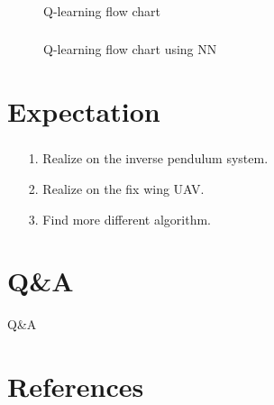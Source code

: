 \documentclass{beamer}
\begin{document}
    \begin{frame}
        \frametitle{\subsubsecname}
        \begin{figure}
            \centering
            
            \caption{Q-learning flow chart}
        \end{figure}

    \end{frame}

    \begin{frame}
        \frametitle{\subsubsecname}
        \begin{figure}
            \centering
            
            \caption{Q-learning flow chart using NN}
        \end{figure}

    \end{frame}

    \section{Expectation}
    \begin{frame}
        \frametitle{\secname}
        \begin{itemize}
            \item[1.] Realize on the inverse pendulum system.
            \item[2.] Realize on the fix wing UAV.
            \item[3.] Find more different algorithm.
        \end{itemize}

    \end{frame}

    \section{Q\&A}
    \begin{frame}

        \centering
        \Large Q\&A

    \end{frame}

    \section*{References}
    \begin{frame}
        \frametitle{\secname}

        \printbibliography

    \end{frame}
\end{document}
